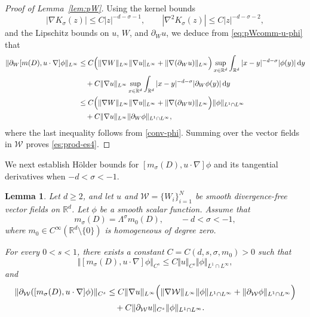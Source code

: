 \documentclass[reqno,11pt,a4paper]{amsart}
\newtheorem{lemma}[theorem]{Lemma}
\newcommand{\R}{\ensuremath{\mathbb{R}}}
\newcommand{\dd}{\mathrm{d}}
\begin{document}
\begin{proof}[Proof of Lemma~\ref{lem:pW}]
Using the kernel bounds
\[
  |\nabla K_\sigma(z)|
  \leq C|z|^{-d-\sigma-1},
  \qquad
  |\nabla^2K_\sigma(z)|
  \leq C|z|^{-d-\sigma-2},
\]
and the Lipschitz bounds on $u$, $W$, and $\partial_Wu$,
we deduce from \eqref{eq:pWcomm-u-phi} that
\begin{align*}
  \Vert \partial_W[m(D),u\cdot\nabla]\phi\Vert _{L^\infty}
  &\leq
  C\Bigl(
    \Vert \nabla W\Vert _{L^\infty}\Vert \nabla u\Vert _{L^\infty}
    +\Vert \nabla(\partial_Wu)\Vert _{L^\infty}
  \Bigr)
  \sup_{x\in\R^d}
  \int_{\R^d}|x-y|^{-d-\sigma}|\phi(y)|\,\dd y
  \\
  &\quad+
  C\Vert \nabla u\Vert _{L^\infty}
  \sup_{x\in\R^d}
  \int_{\R^d}|x-y|^{-d-\sigma}
  |\partial_W\phi(y)|\,\dd y
  \\
  &\leq
  C\Bigl(
    \Vert \nabla W\Vert _{L^\infty}\Vert \nabla u\Vert _{L^\infty}
    +\Vert \nabla(\partial_Wu)\Vert _{L^\infty}
  \Bigr)\Vert \phi\Vert _{L^1\cap L^\infty}
  \\
  &\quad+
  C\Vert \nabla u\Vert _{L^\infty}
  \Vert \partial_W\phi\Vert _{L^1\cap L^\infty},
\end{align*}
where the last inequality follows from \eqref{conv-phi}.
Summing over the vector fields in $\mathcal W$
proves \eqref{es:prod-es4}.
\end{proof}


We next establish H\"older bounds for
$[m_\sigma(D),u\cdot\nabla]\phi$
and its tangential derivatives when $-d<\sigma<-1$.

\begin{lemma}\label{lem:pW-Cgam}
Let $d\geq2$, and let $u$ and
$\mathcal W=\{W_i\}_{i=1}^N$
be smooth divergence-free vector fields on $\R^d$.
Let $\phi$ be a smooth scalar function.
Assume that
\[
  m_\sigma(D)=\Lambda^\sigma m_0(D),
  \qquad -d<\sigma<-1,
\]
where %
$m_0\in C^\infty(\R^d\setminus\{0\})$
is homogeneous of degree zero.

For every $0<s<1$, there exists a constant
$C=C(d,s,\sigma,m_0)>0$ such that
\begin{equation}\label{es:prod-es6}
  \Vert [m_\sigma(D),u\cdot\nabla]\phi\Vert _{C^s}
  \leq
  C\Vert u\Vert _{C^s}\Vert \phi\Vert _{L^1\cap L^\infty},
\end{equation}
and
\begin{equation}\label{es:prod-es7}
\begin{aligned}
  \Vert \partial_{\mathcal W}
  ([m_\sigma(D),u\cdot\nabla]\phi)\Vert _{C^s}
  &\leq
  C\Vert \nabla u\Vert _{L^\infty}
  \Bigl(
    \Vert \nabla\mathcal W\Vert _{L^\infty}
    \Vert \phi\Vert _{L^1\cap L^\infty}
    +
    \Vert \partial_{\mathcal W}\phi\Vert _{L^1\cap L^\infty}
  \Bigr)
  \\
  &\quad+
  C\Vert \partial_{\mathcal W}u\Vert _{C^s}
  \Vert \phi\Vert _{L^1\cap L^\infty}.
\end{aligned}
\end{equation}
\end{lemma}
\end{document}
